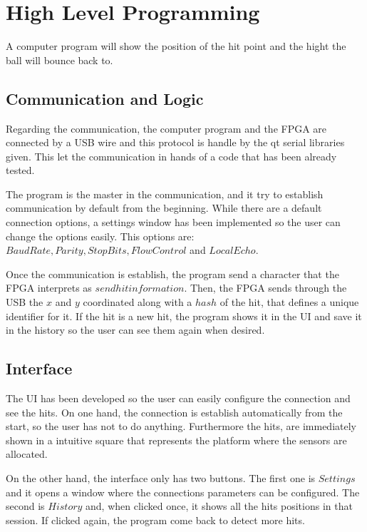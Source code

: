 \chapter{High Level Programming}
\label{chap:high_level_programming}
	A computer program will show the position of the hit point and the hight the ball will bounce back to.

	\section{Communication and Logic}
	\label{sec:communication_and_logic}
		Regarding the communication, the computer program and the FPGA are connected by a USB wire and this protocol is handle by the qt serial libraries given. 
		This let the communication in hands of a code that has been already tested.

		The program is the master in the communication, and it try to establish communication by default from the beginning. 
		While there are a default connection options, a settings window has been implemented so the user can change the options easily. 
		This options are: $Baud Rate, Parity, Stop Bits, Flow Control$ and $Local Echo$.

		Once the communication is establish, the program send a character that the FPGA interprets as $send hit information$. 
		Then, the FPGA sends through the USB the $x$ and $y$ coordinated along with a $hash$ of the hit, that defines a unique identifier for it. 
		If the hit is a new hit, the program shows it in the UI and save it in the history so the user can see them again when desired.

	\section{Interface}
	\label{sec:program_interface}
		The UI has been developed so the user can easily configure the connection and see the hits. 
		On one hand, the connection is establish automatically from the start, so the user has not to do anything. Furthermore the hits, are immediately shown in a intuitive square that represents the platform where the sensors are allocated.

		On the other hand, the interface only has two buttons. The first one is $Settings$ and it opens a window where the connections parameters can be configured. The second is $History$ and, when clicked once, it shows all the hits positions in that session. If clicked again, the program come back to detect more hits.

